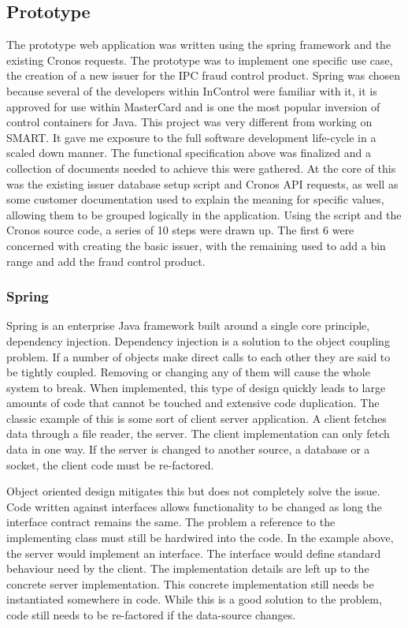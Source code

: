 \documentclass[a4paper, 11pt, titlepage]{article}
\begin{document}
\subsection{Prototype} 
 
The prototype web application was written using the spring framework and the existing Cronos requests. The prototype was to implement one specific use case, the creation of a new issuer for the IPC fraud control product. 
Spring was chosen because several of the developers within InControl were familiar with it, it is approved for use within MasterCard and is one the most popular inversion of control containers for Java. 
This project was very different from working on SMART. It gave me exposure to the full software development life-cycle in a scaled down manner. The functional specification above was finalized and a collection of documents needed to achieve this were gathered. At the core of this was the existing issuer database setup script and Cronos API requests, as well as some customer documentation used to explain the meaning for specific values, allowing them to be grouped logically in the application. 
Using the script and the Cronos source code, a series of 10 steps were drawn up. The first 6 were concerned with creating the basic issuer, with the remaining used to add a bin range and add the fraud control product. 
 
\subsubsection{Spring} 
 
Spring is an enterprise Java framework built around a single core principle, dependency injection. Dependency injection is a solution to the object coupling problem. If a number of objects make direct calls to each other they are said to be tightly coupled. Removing or changing any of them will cause the whole system to break. When implemented, this type of design quickly leads to large amounts of code that cannot be touched and extensive code duplication. The classic example of this is some sort of client server application. A client fetches data through a file reader, the server. The client implementation can only fetch data in one way. If the server is changed to another source, a database or a socket, the client code must be re-factored.  
 
Object oriented design mitigates this but does not completely solve the issue. Code written against interfaces allows functionality to be changed as long the interface contract remains the same. The problem a reference to the implementing class must still be hardwired into the code. In the example above, the server would implement an interface. The interface would define standard behaviour need by the client. The implementation details are left up to the concrete server implementation. This concrete implementation still needs be instantiated somewhere in code. While this is a good solution to the problem, code still needs to be re-factored if the data-source changes. 
 
\end{document}
